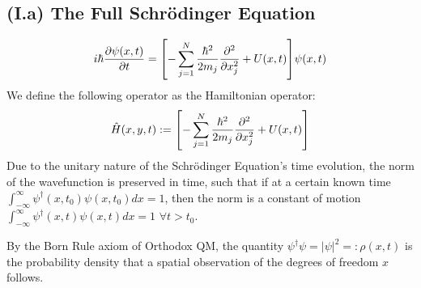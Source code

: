 \documentclass[11pt, a4paper]{article} %
\begin{document}
\subsection*{(I.a) The Full Schrödinger Equation}
\begin{equation}\label{SE}
i\hbar \pdv{\psi(x,t)}{t} = \qty[-\sum_{j=1}^N\frac{\hbar^2}{2m_j}\pdv[2]{}{x_j} + U(x,t)]\psi(x,t)
\end{equation}
We define the following operator as the Hamiltonian operator:
\begin{equation}
\hat{H}(x, y, t):=\qty[-\sum_{j=1}^N\frac{\hbar^2}{2m_j}\pdv[2]{}{x_j} + U(x,t)]
\end{equation}
Due to the unitary nature of the Schrödinger Equation's time evolution, the norm of the wavefunction is preserved in time, such that if at a certain known time $\int^\infty_{-\infty} \psi^\dagger(x,t_0)\psi(x,t_0)dx=1$, then the norm is a constant of motion $\int^\infty_{-\infty} \psi^\dagger(x,t)\psi(x,t)dx=1$ $\forall t>t_0$.

By the Born Rule axiom of Orthodox QM, the quantity $\psi^\dagger\psi=|\psi|^2=:\rho(x,t)$ is the probability density that a spatial observation of the degrees of freedom $x$ follows.
\end{document}
